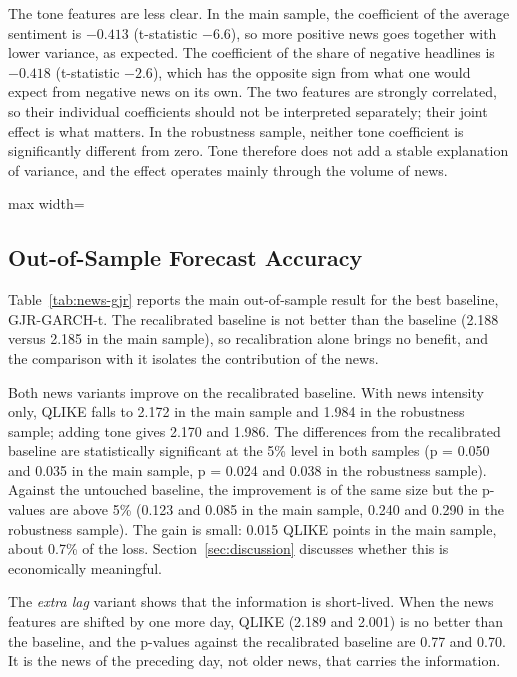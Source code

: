 \documentclass[12pt,a4paper]{article}
\makeatletter
\newcommand{\shortcap}[1]{\csname shortcap@#1\endcsname}
\newcommand{\thesistable}[3]{%
  \begin{table}[htbp]\centering\small
    \caption[\shortcap{#3}]{#2}\label{#3}
    \begin{adjustbox}{max width=\textwidth}\end{adjustbox}
  \end{table}}
\makeatother
\begin{document}
The tone features are less clear. In the main sample, the coefficient of the average sentiment is $-0.413$ (t-statistic $-6.6$), so more positive news goes together with lower variance, as expected. The coefficient of the share of negative headlines is $-0.418$ (t-statistic $-2.6$), which has the opposite sign from what one would expect from negative news on its own. The two features are strongly correlated, so their individual coefficients should not be interpreted separately; their joint effect is what matters. In the robustness sample, neither tone coefficient is significantly different from zero. Tone therefore does not add a stable explanation of variance, and the effect operates mainly through the volume of news.

\thesistable{table5_news_coefficients}{In-sample estimates of the news adjustment in Equation~\eqref{eq:news-model} for the GJR-GARCH-t baseline, quasi-maximum likelihood, whole sample windows (main: January 2017 -- May 2020; robustness: 2022--2023). Standard errors are clustered by date.}{tab:coefficients}

\subsection{Out-of-Sample Forecast Accuracy}\label{sec:results-oos}
Table~\ref{tab:news-gjr} reports the main out-of-sample result for the best baseline, GJR-GARCH-t. The recalibrated baseline is not better than the baseline (2.188 versus 2.185 in the main sample), so recalibration alone brings no benefit, and the comparison with it isolates the contribution of the news.

Both news variants improve on the recalibrated baseline. With news intensity only, QLIKE falls to 2.172 in the main sample and 1.984 in the robustness sample; adding tone gives 2.170 and 1.986. The differences from the recalibrated baseline are statistically significant at the 5\% level in both samples (p = 0.050 and 0.035 in the main sample, p = 0.024 and 0.038 in the robustness sample). Against the untouched baseline, the improvement is of the same size but the p-values are above 5\% (0.123 and 0.085 in the main sample, 0.240 and 0.290 in the robustness sample). The gain is small: 0.015 QLIKE points in the main sample, about 0.7\% of the loss. Section~\ref{sec:discussion} discusses whether this is economically meaningful.

The \emph{extra lag} variant shows that the information is short-lived. When the news features are shifted by one more day, QLIKE (2.189 and 2.001) is no better than the baseline, and the p-values against the recalibrated baseline are 0.77 and 0.70. It is the news of the preceding day, not older news, that carries the information.
\end{document}

